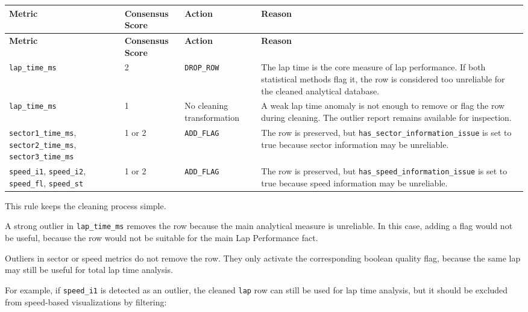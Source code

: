 \documentclass[a4paper,11pt]{article}
\begin{document}
	\begin{longtable}{p{4cm}p{3cm}p{3cm}p{5cm}}
		\toprule
		\textbf{Metric} & \textbf{Consensus Score} & \textbf{Action} & \textbf{Reason} \\
		\midrule
		\endfirsthead
		
		\toprule
		\textbf{Metric} & \textbf{Consensus Score} & \textbf{Action} & \textbf{Reason} \\
		\midrule
		\endhead
		
		\texttt{lap\_time\_ms}
		& 2
		& \texttt{DROP\_ROW}
		& The lap time is the core measure of lap performance. If both statistical methods flag it, the row is considered too unreliable for the cleaned analytical database. \\
		\midrule
		
		\texttt{lap\_time\_ms}
		& 1
		& No cleaning transformation
		& A weak lap time anomaly is not enough to remove or flag the row during cleaning. The outlier report remains available for inspection. \\
		\midrule
		
		\texttt{sector1\_time\_ms}, \texttt{sector2\_time\_ms}, \texttt{sector3\_time\_ms}
		& 1 or 2
		& \texttt{ADD\_FLAG}
		& The row is preserved, but \texttt{has\_sector\_information\_issue} is set to true because sector information may be unreliable. \\
		\midrule
		
		\texttt{speed\_i1}, \texttt{speed\_i2}, \texttt{speed\_fl}, \texttt{speed\_st}
		& 1 or 2
		& \texttt{ADD\_FLAG}
		& The row is preserved, but \texttt{has\_speed\_information\_issue} is set to true because speed information may be unreliable. \\
		\bottomrule
	\end{longtable}
	
	This rule keeps the cleaning process simple.
	
	A strong outlier in \texttt{lap\_time\_ms} removes the row because the main analytical measure is unreliable.
	In this case, adding a flag would not be useful, because the row would not be suitable for the main Lap Performance fact.
	
	Outliers in sector or speed metrics do not remove the row.
	They only activate the corresponding boolean quality flag, because the same lap may still be useful for total lap time analysis.
	
	For example, if \texttt{speed\_i1} is detected as an outlier, the cleaned \texttt{lap} row can still be used for lap time analysis, but it should be excluded from speed-based visualizations by filtering:
	
\end{document}
